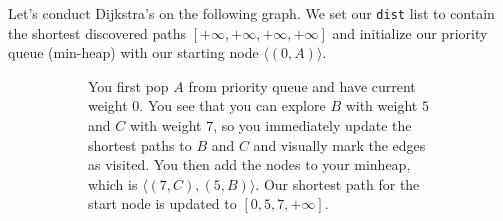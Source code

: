   \begin{example}
    \label{ex:dijkstras-walkthrough}
    Let's conduct Dijkstra's on the following graph. We set our \texttt{dist} list to contain the shortest discovered paths $[+\infty, +\infty, +\infty, +\infty]$ and initialize our priority queue (min-heap) with our starting node $\langle (0, A) \rangle$.
    \begin{figure}[H]
      \centering
      \begin{subfigure}[b]{0.48\textwidth}
        \centering
        \caption{You first pop $A$ from priority queue and have current weight $0$. You see that you can explore $B$ with weight $5$ and $C$ with weight $7$, so you immediately update the shortest paths to $B$ and $C$ and visually mark the edges as visited. You then add the nodes to your minheap, which is $\langle (7, C), (5, B) \rangle$. Our shortest path for the start node is updated to $[0, 5, 7, +\infty]$.}
      \end{subfigure}
      \hfill 
      \begin{subfigure}[b]{0.48\textwidth}
        \centering
\end{subfigure}
\end{figure}
\end{example}
